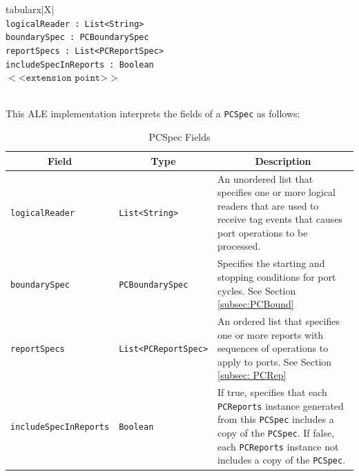 \documentclass[11pt,a4paper,oneside]{article}
\newenvironment{bbox}%
{\begin{table}[h!]\begin{threeparttable}}%
{\end{threeparttable}\end{table}\FloatBarrier}
\newenvironment{bbox}
{\ifvmode\IgnorePar\fi \EndP\Tg<div class='bbox'>}{\Tg</div>\IgnoreIndent}
\begin{document}
\begin{bbox}
\begin{edtable}{tabularx}{\linewidth}{|X|}
\hline 
{}
\\
\texttt{logicalReader : List<String> }\\
\texttt{boundarySpec : PCBoundarySpec}\\
\texttt{reportSpecs : List<PCReportSpec>}\\
\texttt{includeSpecInReports : Boolean}\\
$<$<$\texttt{extension point}$>$>$\\
\texttt{\textendash \textendash \textendash}\\
\hline
\end{edtable}
\end{bbox}

This ALE implementation interprets the fields of a \texttt{PCSpec} as follows:

\begin{table}[!h]
\begin{tabular}{
|p{}%
|p{}%
|p{}|%
}
\hline
\multicolumn{1}{|c|}{\textbf{Field}}&
\multicolumn{1}{c|}{\textbf{Type}}&
\multicolumn{1}{c|}{\textbf{Description}}\\
\hline 
\texttt{logicalReader} &\texttt{List<String>}& An unordered list that specifies one or more logical readers that are used to receive tag events that causes port operations to be processed. \\ \hline 
\texttt{boundarySpec} &\texttt{PCBoundarySpec} & Specifies the starting and stopping conditions for port cycles. See Section \ref{subsec:PCBound} \\ \hline 
\texttt{reportSpecs} &\texttt{List}\newline\texttt{<PCReportSpec>} & An ordered list that specifies one or more reports with sequences of operations to apply to ports. See Section \ref{subsec: PCRep} \\ \hline 
\texttt{includeSpecInReports} &\texttt{Boolean} & If true, specifies that each \texttt{PCReports} instance generated from this \texttt{PCSpec} includes a copy of the \texttt{PCSpec}. If false, each \texttt{PCReports} instance not includes a copy of the \texttt{PCSpec}. \\ \hline 
\end{tabular}
\caption{PCSpec Fields}
\MakeLineNo
\end{table}
\FloatBarrier
\end{document}
